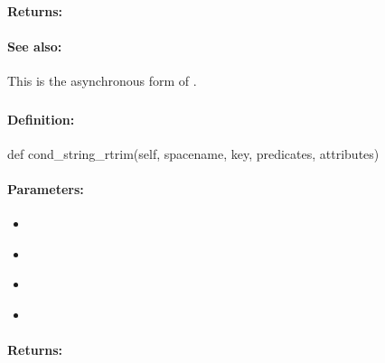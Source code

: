 \paragraph{Returns:}


\paragraph{See also:}  This is the asynchronous form of .

\pagebreak
\subsubsection{}
\label{api:python:cond_string_rtrim}


\paragraph{Definition:}
\begin{pythoncode}
def cond_string_rtrim(self, spacename, key, predicates, attributes)
\end{pythoncode}

\paragraph{Parameters:}
\begin{itemize}[noitemsep]
\item {}\\

\item {}\\

\item {}\\

\item {}\\

\end{itemize}

\paragraph{Returns:}


